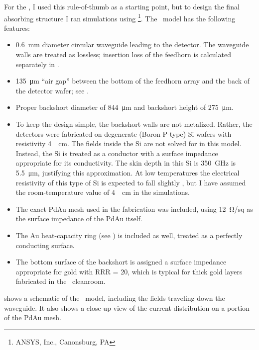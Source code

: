 For the \Imager, I used this rule-of-thumb as a starting point, but to design the final absorbing structure I ran simulations using \HFSS\footnote{ANSYS, Inc., Canonsburg, PA}.
The \HFSS\ model has the following features:
\begin{itemize}
\item \SI{0.6}{\mm} diameter circular waveguide leading to the detector.
      The waveguide walls are treated as lossless; insertion loss of the feedhorn is calculated separately in . 
\item \SI{135}{\um} ``air gap'' between the bottom of the feedhorn array and the back of the detector wafer; see .
\item Proper backshort diameter of \SI{844}{\um} and backshort height of \SI{275}{\um}.
\item To keep the design simple, the backshort walls are not metalized.
      Rather, the detectors were fabricated on degenerate (Boron P-type) Si wafers with resistivity \SI{4}{\mOhm\cm}.
      The fields inside the Si are not solved for in this model.
      Instead, the Si is treated as a conductor with a surface impedance appropriate for its conductivity.
      The skin depth in this Si is \SI{350}{\GHz} is \SI{5.5}{\um}, justifying this approximation.
      At low temperatures the electrical resistivity of this type of Si is expected to fall slightly \cite{chapman_electrical_1963}, but I have assumed the room-temperature value of \SI{4}{\mOhm\cm} in the simulations.
\item The exact PdAu mesh used in the fabrication was included, using \SI{12}{\ohm}/sq as the surface impedance of the PdAu itself.
\item The Au heat-capacity ring (see ) is included as well, treated as a perfectly conducting surface.
\item The bottom surface of the backshort is assigned a surface impedance appropriate for gold with RRR = 20, which is typical for thick gold layers fabricated in the \NIST\ cleanroom.
\end{itemize}
 shows a schematic of the \HFSS\ model, including the fields traveling down the waveguide.
It also shows a close-up view of the current distribution on a portion of the PdAu mesh.


